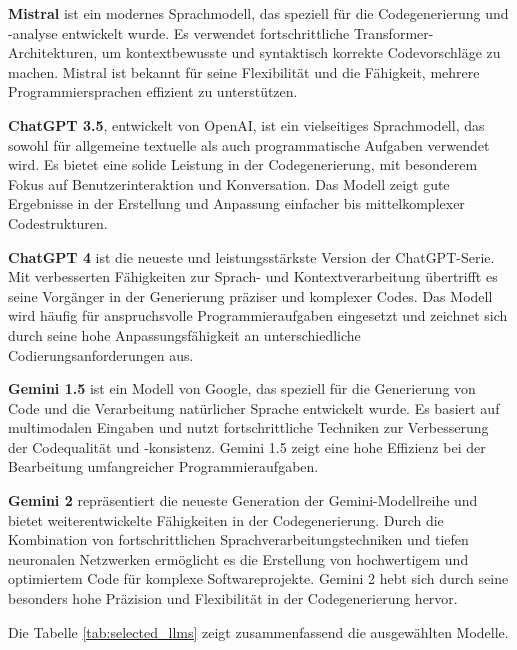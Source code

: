 \textbf{Mistral} ist ein modernes Sprachmodell, das speziell für die Codegenerierung und -analyse entwickelt wurde. Es verwendet fortschrittliche Transformer-Architekturen, um kontextbewusste und syntaktisch korrekte Codevorschläge zu machen. Mistral ist bekannt für seine Flexibilität und die Fähigkeit, mehrere Programmiersprachen effizient zu unterstützen.\vspace{0.2cm}

\textbf{ChatGPT 3.5}, entwickelt von OpenAI, ist ein vielseitiges Sprachmodell, das sowohl für allgemeine textuelle als auch programmatische Aufgaben verwendet wird. Es bietet eine solide Leistung in der Codegenerierung, mit besonderem Fokus auf Benutzerinteraktion und Konversation. Das Modell zeigt gute Ergebnisse in der Erstellung und Anpassung einfacher bis mittelkomplexer Codestrukturen.\vspace{0.2cm}

\textbf{ChatGPT 4} ist die neueste und leistungsstärkste Version der ChatGPT-Serie. Mit verbesserten Fähigkeiten zur Sprach- und Kontextverarbeitung übertrifft es seine Vorgänger in der Generierung präziser und komplexer Codes. Das Modell wird häufig für anspruchsvolle Programmieraufgaben eingesetzt und zeichnet sich durch seine hohe Anpassungsfähigkeit an unterschiedliche Codierungsanforderungen aus.\vspace{0.2cm}

\textbf{Gemini 1.5} ist ein Modell von Google, das speziell für die Generierung von Code und die Verarbeitung natürlicher Sprache entwickelt wurde. Es basiert auf multimodalen Eingaben und nutzt fortschrittliche Techniken zur Verbesserung der Codequalität und -konsistenz. Gemini 1.5 zeigt eine hohe Effizienz bei der Bearbeitung umfangreicher Programmieraufgaben.\vspace{0.2cm}

\textbf{Gemini 2} repräsentiert die neueste Generation der Gemini-Modellreihe und bietet weiterentwickelte Fähigkeiten in der Codegenerierung. Durch die Kombination von fortschrittlichen Sprachverarbeitungstechniken und tiefen neuronalen Netzwerken ermöglicht es die Erstellung von hochwertigem und optimiertem Code für komplexe Softwareprojekte. Gemini 2 hebt sich durch seine besonders hohe Präzision und Flexibilität in der Codegenerierung hervor.\vspace{0.2cm}

Die Tabelle \ref{tab:selected_llms} zeigt zusammenfassend die ausgewählten Modelle.\vspace{0.2cm}

